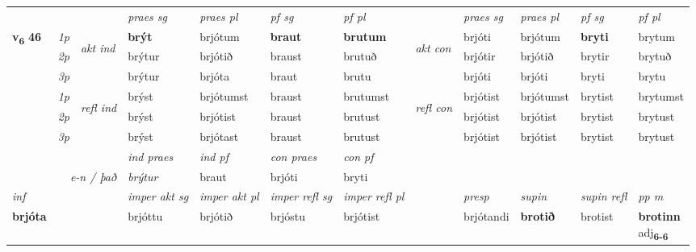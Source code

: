 \begin{longtable}[l]{X>{\footnotesize\itshape}llXXXXlXXXX}
\midrule

 & &   & \textit{praes sg}  & \textit{praes pl}    & \textit{ pf sg} & \textit{pf pl} & & \textit{praes sg}  & \textit{praes pl}    & \textit{pf sg} & \textit{pf pl }  \\ \cmidrule{4-7} \cmidrule{9-12}
 \multirow{2}{*}{{{\textbf{v{\textsubscript{6}}} \Large{\textbf{46}}}}}  & 1p & \multirow{3}{*}{\begin{turn}{90}\textit{akt ind}\end{turn}} & \textbf{brýt} & brjótum & \textbf{braut} & \textbf{brutum} & \multirow{3}{*}{\begin{turn}{90}\textit{akt con}\end{turn}} &brjóti & brjótum & \textbf{bryti} & brytum\\*
 & 2p &  &  brýtur  & brjótið & braust & brutuð & & brjótir & brjótið & brytir & brytuð \\*
 & 3p &  & brýtur & brjóta & braut & brutu & & brjóti & brjóti& bryti & brytu \\*
\cmidrule{4-7} \cmidrule{9-12}
 & 1p & \multirow{3}{*}{\begin{turn}{90}\textit{refl ind}\end{turn}}  & brýst & brjótumst & braust & brutumst & \multirow{3}{*}{\begin{turn}{90}\textit{refl con}\end{turn}}  &brjótist & brjótumst & brytist & brytumst \\*
 & 2p &  & brýst & brjótist & braust & brutust & &brjótist & brjótist & brytist & brytust \\*
 & 3p  & & brýst & brjótast & braust & brutust & & brjótist & brjótist& brytist & brytust \\*
\cmidrule{4-7} \cmidrule{9-12}

   && &  \textit{ind praes} & \textit{ind pf} & \textit{con praes} & \textit{con pf} \\*
\multicolumn{3}{r}{\textit{e-n / það}} & brýtur & braut & brjóti & bryti \\*

\cmidrule{4-7}
   {\textit{inf}} & &  & \textit{imper akt sg} & \textit{imper akt pl} & \textit{imper refl sg} & \textit{imper refl pl} && \textit{presp} & \textit{supin} & \textit{supin refl} & \textit{pp m} \\*
  {\textbf{brjóta}} & && brjóttu  & brjótið & brjóstu & brjótist && brjótandi &  \textbf{brotið} & brotist & \specialcell{\textbf{brotinn} \\ adj\textbf{\textsubscript{6-6}}} \\*


\end{longtable}
